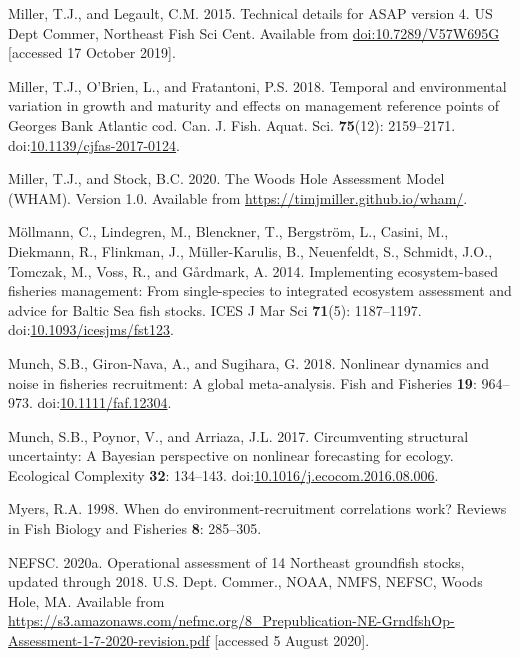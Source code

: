 \documentclass[]{article}
\begin{document}
\leavevmode\hypertarget{ref-miller2015Technical}{}%
Miller, T.J., and Legault, C.M. 2015. Technical details for ASAP version
4. US Dept Commer, Northeast Fish Sci Cent. Available from
\url{doi:10.7289/V57W695G} {[}accessed 17 October 2019{]}.

\leavevmode\hypertarget{ref-miller2018Temporal}{}%
Miller, T.J., O'Brien, L., and Fratantoni, P.S. 2018. Temporal and
environmental variation in growth and maturity and effects on management
reference points of Georges Bank Atlantic cod. Can. J. Fish. Aquat. Sci.
\textbf{75}(12): 2159--2171.
doi:\href{https://doi.org/10.1139/cjfas-2017-0124}{10.1139/cjfas-2017-0124}.

\leavevmode\hypertarget{ref-miller2020Woods}{}%
Miller, T.J., and Stock, B.C. 2020. The Woods Hole Assessment Model
(WHAM). Version 1.0. Available from \url{https://timjmiller.github.io/wham/}.

\leavevmode\hypertarget{ref-mollmann2014Implementing}{}%
Möllmann, C., Lindegren, M., Blenckner, T., Bergström, L., Casini, M.,
Diekmann, R., Flinkman, J., Müller-Karulis, B., Neuenfeldt, S., Schmidt,
J.O., Tomczak, M., Voss, R., and Gårdmark, A. 2014. Implementing
ecosystem-based fisheries management: From single-species to integrated
ecosystem assessment and advice for Baltic Sea fish stocks. ICES J Mar
Sci \textbf{71}(5): 1187--1197.
doi:\href{https://doi.org/10.1093/icesjms/fst123}{10.1093/icesjms/fst123}.

\leavevmode\hypertarget{ref-munch2018Nonlinear}{}%
Munch, S.B., Giron-Nava, A., and Sugihara, G. 2018. Nonlinear dynamics
and noise in fisheries recruitment: A global meta-analysis. Fish and
Fisheries \textbf{19}: 964--973.
doi:\href{https://doi.org/10.1111/faf.12304}{10.1111/faf.12304}.

\leavevmode\hypertarget{ref-munch2017Circumventing}{}%
Munch, S.B., Poynor, V., and Arriaza, J.L. 2017. Circumventing
structural uncertainty: A Bayesian perspective on nonlinear forecasting
for ecology. Ecological Complexity \textbf{32}: 134--143.
doi:\href{https://doi.org/10.1016/j.ecocom.2016.08.006}{10.1016/j.ecocom.2016.08.006}.

\leavevmode\hypertarget{ref-myers1998When}{}%
Myers, R.A. 1998. When do environment-recruitment correlations work?
Reviews in Fish Biology and Fisheries \textbf{8}: 285--305.

\leavevmode\hypertarget{ref-nefsc2020Operational}{}%
NEFSC. 2020a. Operational assessment of 14 Northeast groundfish stocks,
updated through 2018. U.S. Dept. Commer., NOAA, NMFS, NEFSC, Woods Hole,
MA. Available from
\url{https://s3.amazonaws.com/nefmc.org/8_Prepublication-NE-GrndfshOp-Assessment-1-7-2020-revision.pdf}
{[}accessed 5 August 2020{]}.
\end{document}
